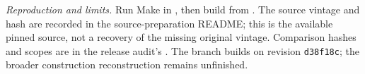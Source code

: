 \small
\textit{Reproduction and limits.} Run Make in
, then build
 from
. The source vintage and hash are
recorded in the source-preparation README; this is the available pinned source,
not a recovery of the missing original vintage. Comparison hashes and scopes are
in the release audit's . The branch builds on
revision \texttt{d38f18c}; the broader construction reconstruction remains unfinished.
\normalsize
